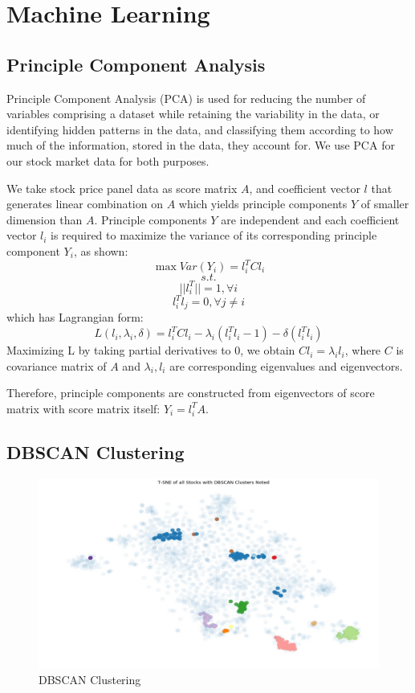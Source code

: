 \section{Machine Learning}

\subsection{Principle Component Analysis}

Principle Component Analysis (PCA) is used for reducing the number of variables comprising a dataset while retaining the variability in the data, or identifying hidden patterns in the data, and classifying them according to how much of the information, stored in the data, they account for.\cite{pca} We use PCA for our stock market data for both purposes. 

We take stock price panel data as score matrix \(A\), and coefficient vector \(l\) that generates linear combination on \(A\) which yields principle components \(Y\) of smaller dimension than \(A\). Principle components \(Y\) are independent and each coefficient vector \(l_i\) is required to maximize the variance of its corresponding principle component \(Y_i\), as shown:\cite{pca}
\begin{equation}
\max{Var(Y_i) = l_i^T C l_i}
\end{equation}
\[s.t.\]
\[||l_i^T|| = 1, \forall i\]
\[l_i^T l_j = 0, \forall j\neq i\]
which has Lagrangian form:
\begin{equation}
L(l_i, \lambda_i, \delta) = l_i^T C l_i - \lambda_i(l_i^T l_i - 1) - \delta(l_i^T l_i)
\end{equation}
Maximizing L by taking partial derivatives to 0, we obtain \(C l_i = \lambda_i l_i\), where \(C\) is covariance matrix of \(A\) and \(\lambda_i, l_i\) are corresponding eigenvalues and eigenvectors. 

Therefore, principle components are constructed from eigenvectors of score matrix with score matrix itself: \(Y_i = l_i^T A\).


\subsection{DBSCAN Clustering}

\begin{figure}[h!]
\centering
\includegraphics[scale=0.4]{background/images/Clustering.jpg}
\caption{DBSCAN Clustering}
\label{fig:cluster}
\end{figure}

